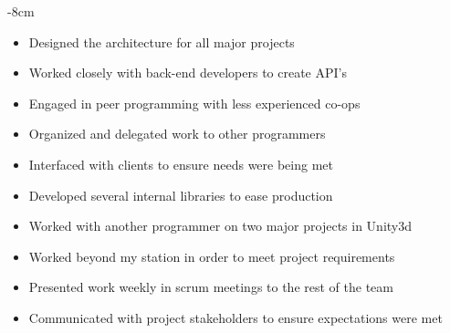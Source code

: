 \documentclass[10pt,a4paper]{altacv}
\begin{document}

\begin{adjustwidth}{}{-8cm}
\makecvheader
\end{adjustwidth}


\begin{itemize}
	\item Designed the architecture for all major projects
	\item Worked closely with back-end developers to create API's
	\item Engaged in peer programming with less experienced co-ops
	\item Organized and delegated work to other programmers
	\item Interfaced with clients to ensure needs were being met
	\item Developed several internal libraries to ease production
\end{itemize}

\divider

\begin{itemize}
	\item Worked with another programmer on two major projects in Unity3d
	\item Worked beyond my station in order to meet project requirements
	\item Presented work weekly in scrum meetings to the rest of the team
	\item Communicated with project stakeholders to ensure expectations were met
\end{itemize}
\end{document}
